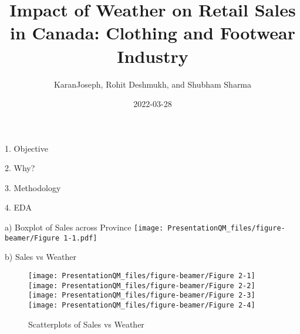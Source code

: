 \documentclass[
  ignorenonframetext,
]{beamer}
\title{Impact of Weather on Retail Sales in Canada: Clothing and
Footwear Industry}
\author{KaranJoseph, Rohit Deshmukh, and Shubham Sharma}
\date{2022-03-28}
\begin{document}
\frame{\titlepage}

\begin{frame}{1. Objective}
\protect\hypertarget{objective}{}
\end{frame}

\begin{frame}{2. Why?}
\protect\hypertarget{why}{}
\end{frame}

\begin{frame}{3. Methodology}
\protect\hypertarget{methodology}{}
\end{frame}

\begin{frame}{4. EDA}
\protect\hypertarget{eda}{}
\begin{block}{a) Boxplot of Sales across Province}
\protect\hypertarget{a-boxplot-of-sales-across-province}{}
\texttt{[image: PresentationQM\_files/figure-beamer/Figure 1-1.pdf]}
\end{block}

\begin{block}{b) Sales vs Weather}
\protect\hypertarget{b-sales-vs-weather}{}
\begin{figure}
\texttt{[image: PresentationQM\_files/figure-beamer/Figure 2-1]} \texttt{[image: PresentationQM\_files/figure-beamer/Figure 2-2]} \texttt{[image: PresentationQM\_files/figure-beamer/Figure 2-3]} \texttt{[image: PresentationQM\_files/figure-beamer/Figure 2-4]} \caption{Scatterplots of Sales vs Weather}\label{fig:Figure 2}
\end{figure}
\end{block}
\end{frame}
\end{document}

